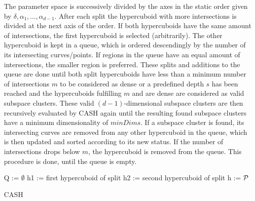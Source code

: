 The parameter space is successively divided by the axes in the static order given by $\delta,\alpha_1,\dotsc,\alpha_{d-1}$. After each split the hypercuboid with more intersections is divided at the next axis of the order. If both hypercuboids have the same amount of intersections, the first hypercuboid is selected (arbitrarily). The other hypercuboid is kept in a queue, which is ordered descendingly by the number of its intersecting curves/points. If regions in the queue have an equal amount of intersections, the smaller region is preferred. These splits and additions to the queue are done until both split hypercuboids have less than a minimum number of intersections $m$ to be considered as dense or a predefined depth $s$ has been reached and the hypercuboids fulfilling $m$ and are dense are considered as valid subspace clusters. These valid $(d-1)$-dimensional subspace clusters are then recursively evaluated by CASH again until the resulting found subspace clusters have a minimum dimensionality of $minDims$. If a subspace cluster is found, its intersecting curves are removed from any other hypercuboid in the queue, which is then updated and sorted according to its new status. If the number of intersections drops below $m$, the hypercuboid is removed from the queue. This procedure is done, until the queue is empty.

\begin{algorithm}
\SetAlgoLined
{}
Q := $\emptyset$\;     
h1 := first hypercuboid of split\;
h2 := second hypercuboid of split\;
h := $\mathcal{P}$

 \caption{CASH}
\end{algorithm}

